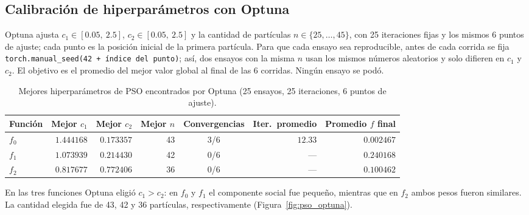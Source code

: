 \subsection{Calibración de hiperparámetros con Optuna}

Optuna ajusta $c_1\in[0.05,\ 2.5]$, $c_2\in[0.05,\ 2.5]$ y la cantidad de
partículas $n\in\{25,\dots,45\}$, con 25 iteraciones fijas y los mismos 6
puntos de ajuste; cada punto es la posición inicial de la primera
partícula. Para que cada ensayo sea reproducible, antes de cada corrida se
fija \texttt{torch.manual\_seed(42 + índice del punto)}; así, dos ensayos con
la misma $n$ usan los mismos números aleatorios y solo difieren en $c_1$ y
$c_2$. El objetivo es el promedio del mejor valor global al final de las 6
corridas. Ningún ensayo se podó.

\begin{table}[H]
\centering
\begin{tabular}{lrrrcrr}
\toprule
Función & Mejor $c_1$ & Mejor $c_2$ & Mejor $n$ & Convergencias & Iter.\ promedio & Promedio $f$ final \\
\midrule
$f_0$ & $1.444168$ & $0.173357$ & 43 & 3/6 & $12.33$ & $0.002467$ \\
$f_1$ & $1.073939$ & $0.214430$ & 42 & 0/6 & ---     & $0.240168$ \\
$f_2$ & $0.817677$ & $0.772406$ & 36 & 0/6 & ---     & $0.100462$ \\
\bottomrule
\end{tabular}
\caption{Mejores hiperparámetros de PSO encontrados por Optuna (25
ensayos, 25 iteraciones, 6 puntos de ajuste).}
\label{tab:pso_optuna}
\end{table}

En las tres funciones Optuna eligió $c_1>c_2$: en $f_0$ y $f_1$ el
componente social fue pequeño, mientras que en $f_2$ ambos pesos fueron
similares. La cantidad elegida fue de 43, 42 y 36 partículas,
respectivamente (Figura~\ref{fig:pso_optuna}).

